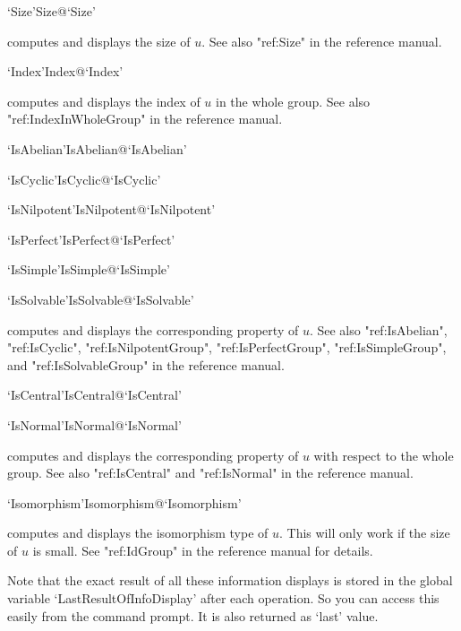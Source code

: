 \>`Size'{Size}@{`Size'}

computes and displays the size of $u$.  See also "ref:Size" in the
{\GAP} reference manual.

\>`Index'{Index}@{`Index'}

computes and displays the  index  of $u$ in   the whole group.  See  also
"ref:IndexInWholeGroup" in the {\GAP} reference manual.

\>`IsAbelian'{IsAbelian}@{`IsAbelian'}

\>`IsCyclic'{IsCyclic}@{`IsCyclic'}

\>`IsNilpotent'{IsNilpotent}@{`IsNilpotent'}

\>`IsPerfect'{IsPerfect}@{`IsPerfect'}

\>`IsSimple'{IsSimple}@{`IsSimple'}

\>`IsSolvable'{IsSolvable}@{`IsSolvable'}

computes and displays the corresponding property of $u$.  See also
"ref:IsAbelian", "ref:IsCyclic", "ref:IsNilpotentGroup", "ref:IsPerfectGroup",
"ref:IsSimpleGroup", and "ref:IsSolvableGroup"  in the {\GAP}
reference manual.

\>`IsCentral'{IsCentral}@{`IsCentral'}

\>`IsNormal'{IsNormal}@{`IsNormal'}

computes and displays the corresponding  property of $u$ with respect  to
the whole group.  See also "ref:IsCentral" and "ref:IsNormal" in the {\GAP}
reference manual.

\>`Isomorphism'{Isomorphism}@{`Isomorphism'}

computes and displays  the isomorphism type of  $u$.  This will only work
if the size of $u$ is small.  See "ref:IdGroup"  in the {\GAP}
reference manual for details.

\bigskip%

Note that the exact result of all these information displays is stored in
the global variable `LastResultOfInfoDisplay' after each operation. So you
can access this easily from the {\GAP} command prompt. It is also returned
as `last' value.


%
%
%
%
%
%
%
%
%
%


